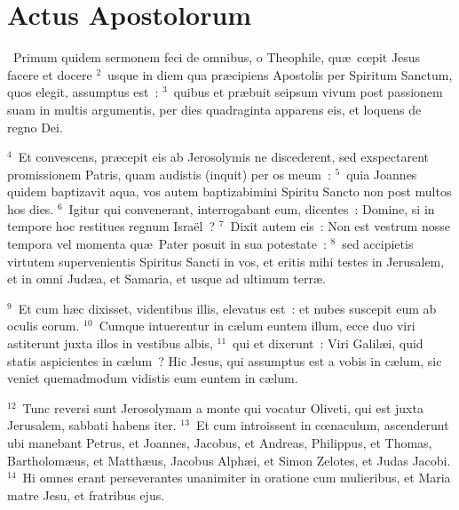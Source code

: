 {\centering \section*{Actus Apostolorum}}\thispagestyle{empty}

~\lettrine[lines=10,image=true,loversize=0.05,lraise=-0.03]{P}{}rimum quidem sermonem feci de omnibus, o Theophile, qu\ae\ cœpit Jesus facere et docere
${}^{2}$~usque in diem qua pr\ae cipiens Apostolis per Spiritum Sanctum, quos elegit, assumptus est~:
${}^{3}$~quibus et pr\ae buit seipsum vivum post passionem suam in multis argumentis, per dies quadraginta apparens eis, et loquens de regno Dei.


${}^{4}$~Et convescens, pr\ae cepit eis ab Jerosolymis ne discederent, sed exspectarent promissionem Patris, quam audistis (inquit) per os meum~:
${}^{5}$~quia Joannes quidem baptizavit aqua, vos autem baptizabimini Spiritu Sancto non post multos hos dies.
${}^{6}$~Igitur qui convenerant, interrogabant eum, dicentes~: Domine, si in tempore hoc restitues regnum Isra\"el~?
${}^{7}$~Dixit autem eis~: Non est vestrum nosse tempora vel momenta qu\ae\ Pater posuit in sua potestate~:
${}^{8}$~sed accipietis virtutem supervenientis Spiritus Sancti in vos, et eritis mihi testes in Jerusalem, et in omni Jud\ae a, et Samaria, et usque ad ultimum terr\ae .


${}^{9}$~Et cum h\ae c dixisset, videntibus illis, elevatus est~: et nubes suscepit eum ab oculis eorum.
${}^{10}$~Cumque intuerentur in c\ae lum euntem illum, ecce duo viri astiterunt juxta illos in vestibus albis,
${}^{11}$~qui et dixerunt~: Viri Galil\ae i, quid statis aspicientes in c\ae lum~? Hic Jesus, qui assumptus est a vobis in c\ae lum, sic veniet quemadmodum vidistis eum euntem in c\ae lum.


${}^{12}$~Tunc reversi sunt Jerosolymam a monte qui vocatur Oliveti, qui est juxta Jerusalem, sabbati habens iter.
${}^{13}$~Et cum introissent in cœnaculum, ascenderunt ubi manebant Petrus, et Joannes, Jacobus, et Andreas, Philippus, et Thomas, Bartholom\ae us, et Matth\ae us, Jacobus Alph\ae i, et Simon Zelotes, et Judas Jacobi.
${}^{14}$~Hi omnes erant perseverantes unanimiter in oratione cum mulieribus, et Maria matre Jesu, et fratribus ejus.


